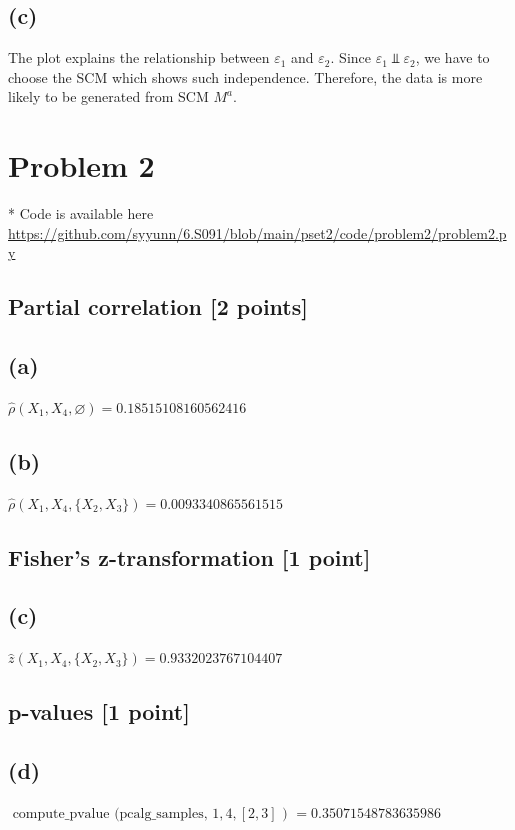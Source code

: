 \documentclass[10pt]{article}
\begin{document}
\subsection{(c)}
The plot explains the relationship between $\varepsilon_1$ and $\varepsilon_2$. Since $\varepsilon_1 \Perp \varepsilon_2$, we have to choose the SCM which shows such independence. Therefore, the data is more likely to be generated from SCM $M^a$.

\section{Problem 2}

* Code is available here \url{https://github.com/syyunn/6.S091/blob/main/pset2/code/problem2/problem2.py}

\subsection{Partial correlation [2 points]}
\subsection{(a)}
$\hat{\rho}\left(X_1, X_4, \varnothing\right) = 0.18515108160562416$

\subsection{(b)}
$\hat{\rho}\left(X_1, X_4, \{X_2, X_3\}\right) = 0.0093340865561515$

\subsection{Fisher’s z-transformation [1 point]}
\subsection{(c)}
$\hat{z}\left(X_1, X_4, \{X_2, X_3\}\right) = 0.9332023767104407$

\subsection{p-values [1 point]}
\subsection{(d)}
$\text { compute\_pvalue (pcalg\_samples, } 1,4,[2,3] \text { ) } = 0.35071548783635986$
\end{document}

